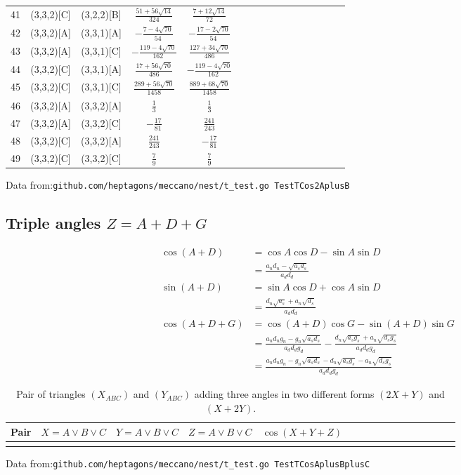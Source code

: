 \documentclass[11pt]{article}
\begin{document}
\begin{longtable}{ | p{1cm}| *{15}{c|} }
41 & (3,3,2)[C] & (3,2,2)[B] & $\frac{51+56\sqrt{14}}{324}$ & $\frac{7+12\sqrt{14}}{72}$\\
42 & (3,3,2)[A] & (3,3,1)[A] & $-\frac{7-4\sqrt{70}}{54}$ & $-\frac{17-2\sqrt{70}}{54}$\\
43 & (3,3,2)[A] & (3,3,1)[C] & $-\frac{119-4\sqrt{70}}{162}$ & $\frac{127+34\sqrt{70}}{486}$\\
44 & (3,3,2)[C] & (3,3,1)[A] & $\frac{17+56\sqrt{70}}{486}$ & $-\frac{119-4\sqrt{70}}{162}$\\
45 & (3,3,2)[C] & (3,3,1)[C] & $\frac{289+56\sqrt{70}}{1458}$ & $\frac{889+68\sqrt{70}}{1458}$\\
46 & (3,3,2)[A] & (3,3,2)[A] & $\frac{1}{3}$ & $\frac{1}{3}$\\
47 & (3,3,2)[A] & (3,3,2)[C] & $-\frac{17}{81}$ & $\frac{241}{243}$\\
48 & (3,3,2)[C] & (3,3,2)[A] & $\frac{241}{243}$ & $-\frac{17}{81}$\\
49 & (3,3,2)[C] & (3,3,2)[C] & $\frac{7}{9}$ & $\frac{7}{9}$\\
\end{longtable}
Data from:\texttt{github.com/heptagons/meccano/nest/t\_test.go TestTCos2AplusB}

\subsection{Triple angles $Z = A+D+G$}

\begin{align}
\cos{(A+D)} &= \cos{A}\cos{D} - \sin{A}\sin{D} \nonumber\\
 &= \frac{a_nd_n - \sqrt{a_sd_s}}{a_dd_d}\\
\sin{(A+D)} &= \sin{A}\cos{D} + \cos{A}\sin{D} \nonumber\\
 &= \frac{d_n\sqrt{a_s} + a_n\sqrt{d_s}}{a_dd_d}\\
\cos{(A+D+G)} &= \cos{(A+D)}\cos{G} - \sin{(A+D)}\sin{G} \nonumber\\
 &= \frac{a_nd_ng_n - g_n\sqrt{a_sd_s}}{a_dd_dg_d}
 -\frac{d_n\sqrt{a_sg_s} + a_n\sqrt{d_sg_s}}{a_dd_dg_d} \nonumber\\
 &= \frac{a_nd_ng_n - g_n\sqrt{a_sd_s} - d_n\sqrt{a_sg_s} - a_n\sqrt{d_sg_s}}{a_dd_dg_d}
\end{align}

\begin{longtable}{ | p{1cm}| *{15}{c|} }
\caption{Pair of triangles $(X_{ABC})$ and $(Y_{ABC})$ adding three angles 
in two different forms $(2X+Y)$ and $(X+2Y)$.}\\
\hline
Pair & $X = A \lor B \lor C$ & $Y = A \lor B \lor C$ & $Z = A \lor B \lor C$ & $\cos(X+Y+Z)$ \\
\hline\endhead
\hline\endfoot
\end{longtable}
Data from:\texttt{github.com/heptagons/meccano/nest/t\_test.go TestTCosAplusBplusC}
\end{document}
